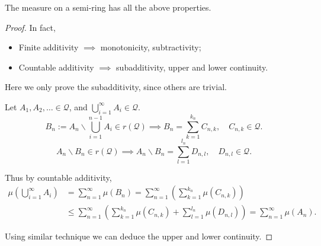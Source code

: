 \begin{theorem}
    The measure on a semi-ring has all the above properties.
\end{theorem}
\begin{proof}[Proof]
    In fact,
	\begin{itemize}
		\item Finite additivity $ \implies $ monotonicity, subtractivity;
		\item Countable additivity $\implies$ subadditivity, upper and lower continuity.
	\end{itemize}

	Here we only prove the subadditivity, since others are trivial.

	Let $A_1,A_2,\dots\in \mathscr{Q}$, and $\bigcup_{i=1}^\infty A_i\in \mathscr{Q}$.
	\[
	B_n := A_n \backslash \bigcup_{i=1}^{n-1} A_i \in r(\mathscr{Q})
	\implies B_n = \sum_{k=1}^{k_n} C_{n,k},\quad C_{n,k}\in \mathscr{Q}.
	\]
	\[
	A_n \backslash B_n \in r(\mathscr{Q}) \implies
	A_n \backslash B_n = \sum_{l=1}^{l_n} D_{n,l},\quad D_{n,l}\in \mathscr{Q}.
	\]
	
	Thus by countable additivity,
	\begin{align*}
		\mu\left(\bigcup_{i=1}^\infty A_i\right) &= \sum_{n=1}^{\infty} \mu(B_n)
		= \sum_{n=1}^{\infty}\left( \sum_{k=1}^{k_n} \mu(C_{n,k}) \right)\\
		&\le \sum_{n=1}^{\infty}\left( \sum_{k=1}^{k_n} \mu(C_{n,k})+ \sum_{l=1}^{l_n}\mu(D_{n,l}) \right)
		= \sum_{n=1}^{\infty} \mu(A_n). 
	\end{align*}
	
	Using similar technique we can deduce the upper and lower continuity.
\end{proof}
